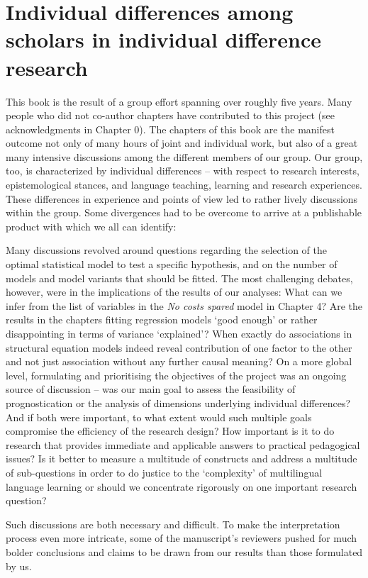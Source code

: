 \documentclass[output=paper]{langsci/langscibook}
\begin{document}
\section{Individual differences among scholars in individual difference research}

This book is the result of a group effort spanning over roughly five years. Many people who did not co-author chapters have contributed to this project (see acknowledgments in Chapter 0). The chapters of this book are the manifest outcome not only of many hours of joint and individual work, but also of a great many intensive discussions among the different members of our group. Our group, too, is characterized by individual differences – with respect to research interests, epistemological stances, and language teaching, learning and research experiences. These differences in experience and points of view led to rather lively discussions within the group. Some divergences had to be overcome to arrive at a publishable product with which we all can identify:

Many discussions revolved around questions regarding the selection of the optimal statistical model to test a specific hypothesis, and on the number of models and model variants that should be fitted. The most challenging debates, however, were in the implications of the results of our analyses: What can we infer from the list of variables in the \textit{No costs spared} model in Chapter 4? Are the results in the chapters fitting regression models ‘good enough’ or rather disappointing in terms of variance ‘explained’? When exactly do associations in structural equation models indeed reveal contribution of one factor to the other and not just association without any further causal meaning? On a more global level, formulating and prioritising the objectives of the project was an ongoing source of discussion – was our main goal to assess the feasibility of prognostication or the analysis of dimensions underlying individual differences? And if both were important, to what extent would such multiple goals compromise the efficiency of the research design? How important is it to do research that provides immediate and applicable answers to practical pedagogical issues? Is it better to measure a multitude of constructs and address a multitude of sub-questions in order to do justice to the ‘complexity’ of multilingual language learning or should we concentrate rigorously on one important research question? 

Such discussions are both necessary and difficult. To make the interpretation process even more intricate, some of the manuscript’s reviewers pushed for much bolder conclusions and claims to be drawn from our results than those formulated by us.
\end{document}
